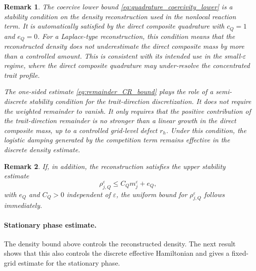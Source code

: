 \documentclass[11pt, dina4, amsfont12]{article}
\newtheorem{remark}{Remark}[section]
\begin{document}
\begin{remark}
The coercive lower bound \eqref{eq:quadrature_coercivity_lower} is a stability
condition on the density reconstruction used in the nonlocal reaction term.
It is automatically satisfied by the direct composite quadrature with
\(c_Q=1\) and \(e_Q=0\). For a Laplace-type reconstruction, this condition
means that the reconstructed density does not underestimate the direct
composite mass by more than a controlled amount. This is consistent with its
intended use in the small-\(\varepsilon\) regime, where the direct composite
quadrature may under-resolve the concentrated trait profile.

The one-sided estimate \eqref{eq:remainder_CR_bound} plays the role of a
semi-discrete stability condition for the trait-direction discretization. It
does not require the weighted remainder to vanish. It only requires that the
positive contribution of the trait-direction remainder is no stronger than a
linear growth in the direct composite mass, up to a controlled grid-level
defect \(r_h\). Under this condition, the logistic damping generated by the
competition term remains effective in the discrete density estimate.
\end{remark}

\begin{remark}
If, in addition, the reconstruction satisfies the upper stability estimate
\begin{equation}\label{eq:quadrature_coercivity_upper}
    \rho_{j,Q}^\varepsilon
    \le
    C_Q m_j^\varepsilon +e_Q,
\end{equation}
with $e_Q$ and \(C_Q>0\) independent of \(\varepsilon\), 
the uniform bound for \(\rho_{j,Q}^\varepsilon\) follows immediately.
\end{remark}


\paragraph{Stationary phase estimate.}

The density bound above controls the reconstructed density. The next result
shows that this also controls the discrete effective Hamiltonian and gives a
fixed-grid estimate for the stationary phase.
\end{document}
